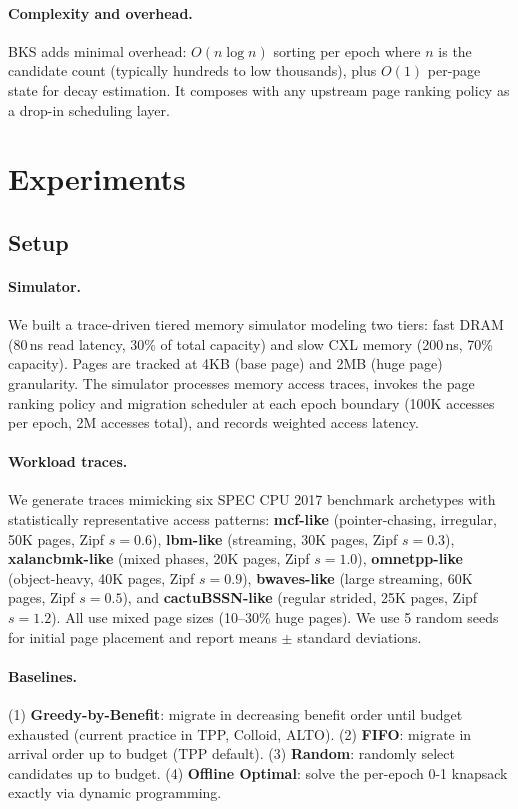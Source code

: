 \documentclass{article}
\begin{document}
\paragraph{Complexity and overhead.} BKS adds minimal overhead: $O(n \log n)$ sorting per epoch where $n$ is the candidate count (typically hundreds to low thousands), plus $O(1)$ per-page state for decay estimation. It composes with any upstream page ranking policy as a drop-in scheduling layer.

\section{Experiments}
\label{sec:experiments}

\subsection{Setup}

\paragraph{Simulator.} We built a trace-driven tiered memory simulator modeling two tiers: fast DRAM (80\,ns read latency, 30\% of total capacity) and slow CXL memory (200\,ns, 70\% capacity). Pages are tracked at 4KB (base page) and 2MB (huge page) granularity. The simulator processes memory access traces, invokes the page ranking policy and migration scheduler at each epoch boundary (100K accesses per epoch, 2M accesses total), and records weighted access latency.

\paragraph{Workload traces.} We generate traces mimicking six SPEC CPU 2017 benchmark archetypes with statistically representative access patterns: \textbf{mcf-like} (pointer-chasing, irregular, 50K pages, Zipf $s{=}0.6$), \textbf{lbm-like} (streaming, 30K pages, Zipf $s{=}0.3$), \textbf{xalancbmk-like} (mixed phases, 20K pages, Zipf $s{=}1.0$), \textbf{omnetpp-like} (object-heavy, 40K pages, Zipf $s{=}0.9$), \textbf{bwaves-like} (large streaming, 60K pages, Zipf $s{=}0.5$), and \textbf{cactuBSSN-like} (regular strided, 25K pages, Zipf $s{=}1.2$). All use mixed page sizes (10--30\% huge pages). We use 5 random seeds for initial page placement and report means $\pm$ standard deviations.

\paragraph{Baselines.} (1) \textbf{Greedy-by-Benefit}: migrate in decreasing benefit order until budget exhausted (current practice in TPP, Colloid, ALTO). (2) \textbf{FIFO}: migrate in arrival order up to budget (TPP default). (3) \textbf{Random}: randomly select candidates up to budget. (4) \textbf{Offline Optimal}: solve the per-epoch 0-1 knapsack exactly via dynamic programming.
\end{document}
